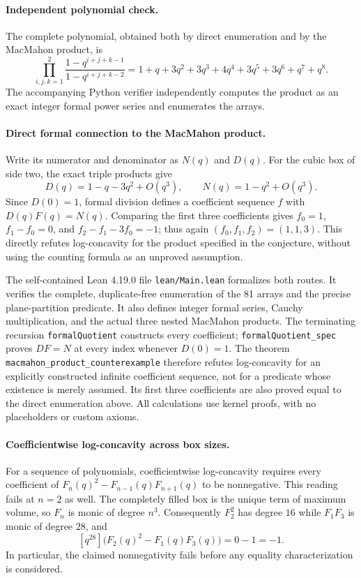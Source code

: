 \documentclass[10pt]{article}
\begin{document}
\paragraph{Independent polynomial check.}
The complete polynomial, obtained both by direct enumeration and by the
MacMahon product, is
\[
\prod_{i,j,k=1}^{2}\frac{1-q^{i+j+k-1}}{1-q^{i+j+k-2}}
=1+q+3q^2+3q^3+4q^4+3q^5+3q^6+q^7+q^8.
\]
The accompanying Python verifier independently computes the product as an
exact integer formal power series and enumerates the arrays.

\paragraph{Direct formal connection to the MacMahon product.}
Write its numerator and denominator as $N(q)$ and $D(q)$. For the cubic box
of side two, the exact triple products give
\[
 D(q)=1-q-3q^2+O(q^3),\qquad N(q)=1-q^2+O(q^3).
\]
Since $D(0)=1$, formal division defines a coefficient sequence $f$ with
$D(q)F(q)=N(q)$. Comparing the first three coefficients gives
$f_0=1$, $f_1-f_0=0$, and $f_2-f_1-3f_0=-1$; thus again
$(f_0,f_1,f_2)=(1,1,3)$. This directly refutes log-concavity for the product
specified in the conjecture, without using the counting formula as an
unproved assumption.

The self-contained Lean 4.19.0 file \texttt{lean/Main.lean} formalizes both routes.
It verifies the complete, duplicate-free enumeration of the 81 arrays and
the precise plane-partition predicate. It also defines integer formal series,
Cauchy multiplication, and the actual three nested MacMahon products. The
terminating recursion \texttt{formalQuotient} constructs every coefficient;
\texttt{formalQuotient\_spec} proves $D F=N$ at every index whenever $D(0)=1$.
The theorem \texttt{macmahon\_product\_counterexample} therefore refutes
log-concavity for an explicitly constructed infinite coefficient sequence,
not for a predicate whose existence is merely assumed. Its first three
coefficients are also proved equal to the direct enumeration above.
All calculations use kernel proofs, with no placeholders or custom axioms.

\paragraph{Coefficientwise log-concavity across box sizes.}
For a sequence of polynomials, coefficientwise log-concavity requires every
coefficient of $F_n(q)^2-F_{n-1}(q)F_{n+1}(q)$ to be nonnegative.
This reading fails at $n=2$ as well. The completely filled box is the unique
term of maximum volume, so $F_n$ is monic of degree $n^3$.
Consequently $F_2^2$ has degree $16$ while $F_1F_3$ is monic of degree $28$,
and
\[
 [q^{28}]\bigl(F_2(q)^2-F_1(q)F_3(q)\bigr)=0-1=-1.
\]
In particular, the claimed nonnegativity fails before any equality
characterization is considered.
\end{document}
